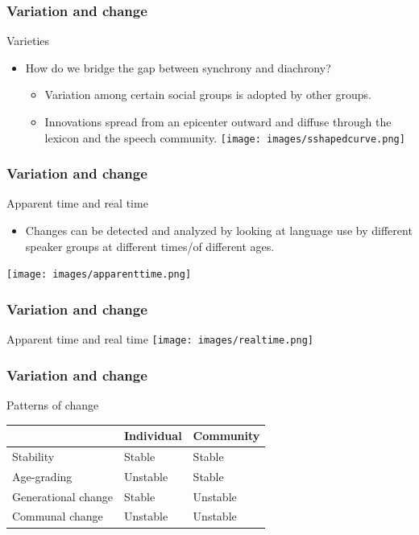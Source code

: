 \documentclass[12pt, table]{beamer}
\begin{document}
\begin{frame}
\frametitle{Variation and change}
Varieties
\begin{itemize}
\item How do we bridge the gap between synchrony and diachrony?
\begin{itemize}
\item Variation among certain social groups is adopted by other groups.
\item Innovations spread from an epicenter outward and diffuse through the lexicon and the speech community.
\texttt{[image: images/sshapedcurve.png]}
\end{itemize} 
\end{itemize}
\end{frame}

\begin{frame}
\frametitle{Variation and change}
Apparent time and real time
\begin{itemize}
\item Changes can be detected and analyzed by looking at language use by different speaker groups at different times/of different ages.
\end{itemize} 
\texttt{[image: images/apparenttime.png]}
\end{frame}

\begin{frame}
\frametitle{Variation and change}
Apparent time and real time
\texttt{[image: images/realtime.png]}
\end{frame}

\begin{frame}
\frametitle{Variation and change}
Patterns of change
\begin{tabularx}{\textwidth}{lll}
\hline
& \textbf{Individual} & \textbf{Community} \\
\hline
Stability & Stable & Stable \\
Age-grading & Unstable & Stable \\
Generational change & Stable & Unstable \\
Communal change & Unstable & Unstable \\
\hline 
\end{tabularx}
\end{frame}
\end{document}
